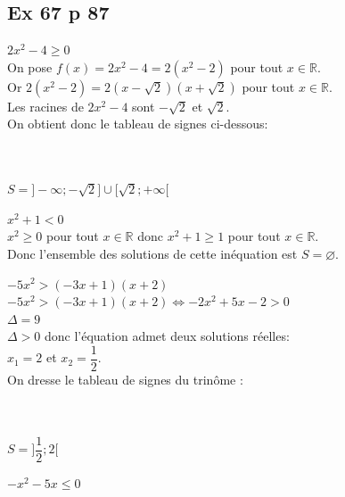 \documentclass[12pt,a4paper]{book}
\begin{document}
\subsection*{Ex 67 p 87}
    \begin{enumMet}
        \item $2 x^{2}-4 \geqslant 0$\\
        On pose $f(x)=2 x^{2}-4=2\left(x^{2}-2\right)$ pour tout $x \in \mathbb{R}$.\\
        Or $2\left(x^{2}-2\right)=2(x-\sqrt{2})(x+\sqrt{2})$ pour tout $x \in \mathbb{R}$.\\
        Les racines de $2 x^{2}-4$ sont $-\sqrt{2}$ et $\sqrt{2}$.\\ 
        On obtient donc le tableau de signes ci-dessous:\\
        \\
        \ \\
        $S=\bigg]-\infty ;-\sqrt{2}\bigg] \cup\bigg[\sqrt{2} ;+\infty\bigg[$
        \item $x^{2}+1<0$\\
        $x^{2} \geq 0$ pour tout $x \in \mathbb{R}$ donc $x^{2}+1 \geq 1$ pour tout $x \in \mathbb{R}$.\\
        Donc l'ensemble des solutions de cette inéquation est $S=\varnothing$.
        \item $-5 x^{2}>(-3 x+1)(x+2)$\\
        $-5 x^{2}>(-3 x+1)(x+2) \Leftrightarrow-2 x^{2}+5 x-2>0$\\
        $\Delta=9$\\ 
        $\Delta>0$ donc l'équation admet deux solutions réelles:\\
        $x_{1}=2$ et $x_{2}=\dfrac{1}{2}$.\\
        On dresse le tableau de signes du trinôme : \\
        \\
        \ \\
        $S=\bigg] \dfrac{1}{2} ; 2\bigg[$
        \item $-x^{2}-5 x \leqslant 0$\\

\end{enumMet}
\end{document}
